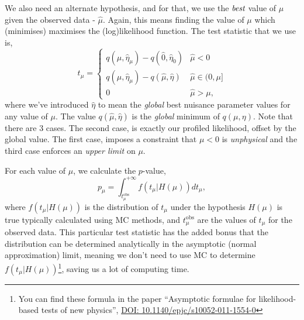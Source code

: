 We also need an alternate hypothesis, and for that, we use the $\emph{best}$ value of $\mu$ given the observed data - $\hat{\mu}$. Again, this means finding the value of $\mu$ which (minimises) maximises the (log)likelihood function. The test statistic that we use is,
\begin{equation}
    t_{\mu} = \begin{cases}
                q(\mu,\hat{\eta}_{\mu})-q(\hat{0},\hat{\eta}_{0})    & \hat{\mu} < 0 \\
                q(\mu,\hat{\eta}_{\mu})-q(\hat{\mu},\hat{\eta})    & \hat{\mu} \in (0,\mu] \\
                0               & \hat{\mu}>\mu,
                \end{cases}
\end{equation}
where we've introduced $\hat{\eta}$ to mean the \emph{global} best nuisance parameter values for any value of $\mu$. The value $q(\hat{\mu},\hat{\eta})$ is the \emph{global} minimum of $q(\mu,\eta)$. Note that there are 3 cases. The second case, is exactly our profiled likelihood, offset by the global value. The first case, imposes a constraint that $\mu<0$ is \emph{unphysical} and the third case enforces an \emph{upper limit} on $\mu$. 

For each value of $\mu$, we calculate the $p$-value, 
\begin{equation}
    p_{\mu} = \int_{t^{\mathrm{obs}}_{\mu}}^{+\infty} f(t_{\mu}|H(\mu))dt_{\mu},
\end{equation}
where $f(t_{\mu}|H(\mu))$ is the distribution of $t_{\mu}$ under the hypothesis $H(\mu)$ is true typically calculated using MC methods, and $t^{\mathrm{obs}}_{\mu}$ are the values of $t_{\mu}$ for the observed data. This particular test statistic has the added bonus that the distribution can be determined analytically in the asymptotic (normal approximation) limit, meaning we don't need to use MC to determine $f(t_{\mu}|H(\mu))$\footnote{You can find these formula in the paper ``Asymptotic formulae for likelihood-based tests of new physics'', \href{https://arxiv.org/abs/1007.1727}{DOI: 10.1140/epjc/s10052-011-1554-0}}, saving us a lot of computing time.

